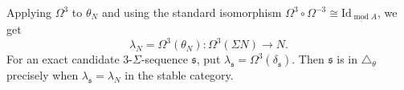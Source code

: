 \documentclass[a4paper,reqno,10pt]{amsart}
\numberwithin{equation}{section}
\DeclareMathOperator{\modu}{mod}
\DeclareMathOperator{\End}{End}
\newcommand{\kk}{\mathbb F_2}
\newcommand{\ol}[1]{\underline{#1}}
\begin{document}
Applying $\Omega^3$ to $\theta_N$ and using the standard isomorphism
$\Omega^3\circ\Omega^{-3}\cong
\mathrm{Id}_{\ol{\modu}A}$, we get
\[
  \lambda_N=\Omega^3(\theta_N):\Omega^3(\Sigma N)\longrightarrow N.
\]
 For an exact candidate $3$-$\Sigma$-sequence
$\mathfrak s$, put
$\lambda_{\mathfrak s}=\Omega^3(\delta_{\mathfrak s})$.
Then $\mathfrak s$ is in $\triangle_\theta$ precisely when
$\lambda_{\mathfrak s}=\lambda_N$ in the stable category. 








\end{document}
